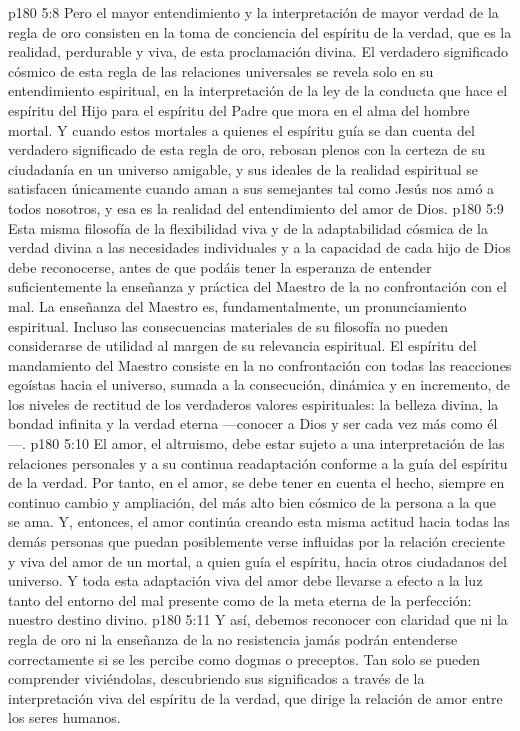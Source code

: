 \vs p180 5:8 Pero el mayor entendimiento y la interpretación de mayor verdad de la regla de oro consisten en la toma de conciencia del espíritu de la verdad, que es la realidad, perdurable y viva, de esta proclamación divina. El verdadero significado cósmico de esta regla de las relaciones universales se revela solo en su entendimiento espiritual, en la interpretación de la ley de la conducta que hace el espíritu del Hijo para el espíritu del Padre que mora en el alma del hombre mortal. Y cuando estos mortales a quienes el espíritu guía se dan cuenta del verdadero significado de esta regla de oro, rebosan plenos con la certeza de su ciudadanía en un universo amigable, y sus ideales de la realidad espiritual se satisfacen únicamente cuando aman a sus semejantes tal como Jesús nos amó a todos nosotros, y esa es la realidad del entendimiento del amor de Dios.
\vs p180 5:9 Esta misma filosofía de la flexibilidad viva y de la adaptabilidad cósmica de la verdad divina a las necesidades individuales y a la capacidad de cada hijo de Dios debe reconocerse, antes de que podáis tener la esperanza de entender suficientemente la enseñanza y práctica del Maestro de la no confrontación con el mal. La enseñanza del Maestro es, fundamentalmente, un pronunciamiento espiritual. Incluso las consecuencias materiales de su filosofía no pueden considerarse de utilidad al margen de su relevancia espiritual. El espíritu del mandamiento del Maestro consiste en la no confrontación con todas las reacciones egoístas hacia el universo, sumada a la consecución, dinámica y en incremento, de los niveles de rectitud de los verdaderos valores espirituales: la belleza divina, la bondad infinita y la verdad eterna ---conocer a Dios y ser cada vez más como él---.
\vs p180 5:10 El amor, el altruismo, debe estar sujeto a una interpretación de las relaciones personales y a su continua readaptación conforme a la guía del espíritu de la verdad. Por tanto, en el amor, se debe tener en cuenta el hecho, siempre en continuo cambio y ampliación, del más alto bien cósmico de la persona a la que se ama. Y, entonces, el amor continúa creando esta misma actitud hacia todas las demás personas que puedan posiblemente verse influidas por la relación creciente y viva del amor de un mortal, a quien guía el espíritu, hacia otros ciudadanos del universo. Y toda esta adaptación viva del amor debe llevarse a efecto a la luz tanto del entorno del mal presente como de la meta eterna de la perfección: nuestro destino divino.
\vs p180 5:11 Y así, debemos reconocer con claridad que ni la regla de oro ni la enseñanza de la no resistencia jamás podrán entenderse correctamente si se les percibe como dogmas o preceptos. Tan solo se pueden comprender viviéndolas, descubriendo sus significados a través de la interpretación viva del espíritu de la verdad, que dirige la relación de amor entre los seres humanos.

